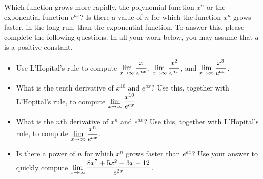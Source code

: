 \begin{problem}
 Which function grows more rapidly, the polynomial function $x^n$ or the exponential function $e^{ax}$? Is there a value of $n$ for which the function $x^n$ grows faster, in the long run, than the exponential function. To answer this, please complete the following questions.  In all your work below, you may assume that $a$ is a positive constant.
\begin{itemize}
 \item Use L'Hopital's rule to compute $\displaystyle\lim_{x\to\infty}\frac{x}{e^{ax}}$, $\displaystyle\lim_{x\to\infty}\frac{x^2}{e^{ax}}$, and $\displaystyle\lim_{x\to\infty}\frac{x^3}{e^{ax}}$.
 \item What is the tenth derivative of $x^{10}$ and $e^{ax}$? Use this, together with L'Hopital's rule, to compute $\displaystyle\lim_{x\to\infty}\frac{x^{10}}{e^{ax}}$.
 \item What is the $n$th derivative of $x^{n}$ and $e^{ax}$? Use this, together with L'Hopital's rule, to compute $\displaystyle\lim_{x\to\infty}\frac{x^n}{e^{ax}}$.
\item Is there a power of $n$ for which $x^n$ grows faster than $e^{ax}$? Use your answer to quickly compute $\displaystyle\lim_{x\to\infty}\frac{8x^7+5x^2-3x+12}{e^{2x}}$.
\end{itemize}

\end{problem}


